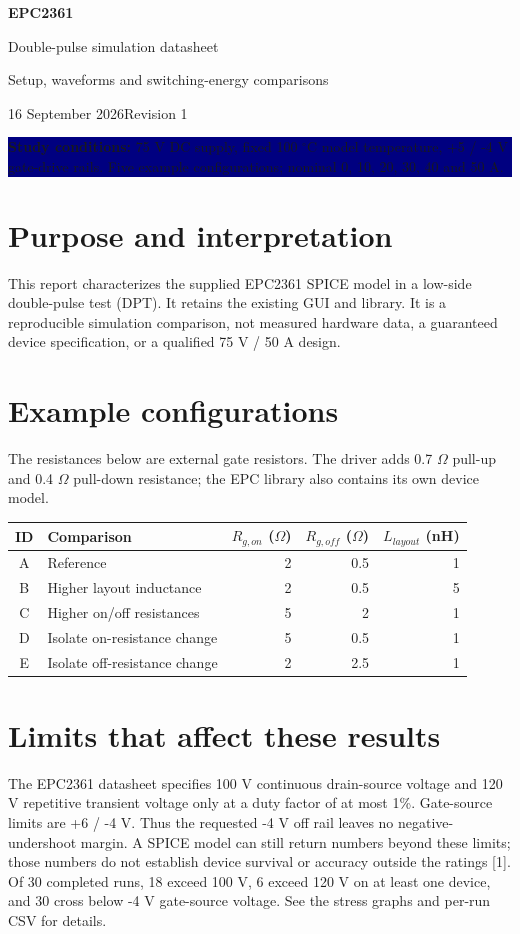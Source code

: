 \documentclass[10pt,a4paper]{article}
\begin{document}
{\Huge\bfseries\color{navy} EPC2361}\par
{\LARGE\color{teal} Double-pulse simulation datasheet}\par
{\large Setup, waveforms and switching-energy comparisons}\par
16 September 2026\hfill Revision 1\par
\medskip
\colorbox{navy}{\parbox{0.96\linewidth}{\color{white}\textbf{Study conditions:} 75 V DC supply, fixed 100 $^\circ$C model temperature, +5 / -4 V gate-drive rails. Five example configurations; nominal 0, 10, 20, 30, 40 and 50 A.}}
\section*{Purpose and interpretation}
This report characterizes the supplied EPC2361 SPICE model in a low-side double-pulse test (DPT). It retains the existing GUI and library. It is a reproducible simulation comparison, not measured hardware data, a guaranteed device specification, or a qualified 75 V / 50 A design.
\section*{Example configurations}
The resistances below are external gate resistors. The driver adds 0.7 $\Omega$ pull-up and 0.4 $\Omega$ pull-down resistance; the EPC library also contains its own device model.
\begin{center}\begin{tabular}{clrrr}\toprule
ID & Comparison & $R_{g,on}$ ($\Omega$) & $R_{g,off}$ ($\Omega$) & $L_{layout}$ (nH)\\\midrule
A & Reference & 2 & 0.5 & 1\\
B & Higher layout inductance & 2 & 0.5 & 5\\
C & Higher on/off resistances & 5 & 2 & 1\\
D & Isolate on-resistance change & 5 & 0.5 & 1\\
E & Isolate off-resistance change & 2 & 2.5 & 1\\\bottomrule
\end{tabular}\end{center}
\section*{Limits that affect these results}
The EPC2361 datasheet specifies 100 V continuous drain-source voltage and 120 V repetitive transient voltage only at a duty factor of at most 1\%. Gate-source limits are +6 / -4 V. Thus the requested -4 V off rail leaves no negative-undershoot margin. A SPICE model can still return numbers beyond these limits; those numbers do not establish device survival or accuracy outside the ratings [1].
Of 30 completed runs, 18 exceed 100 V, 6 exceed 120 V on at least one device, and 30 cross below -4 V gate-source voltage. See the stress graphs and per-run CSV for details.\par
\end{document}
